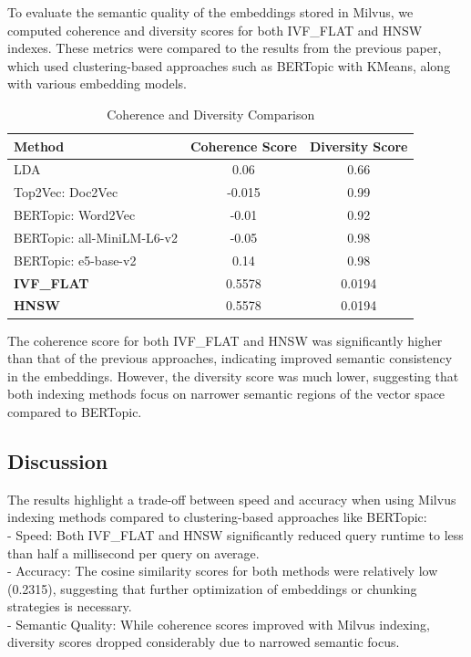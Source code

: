 \documentclass[12pt]{article}
\begin{document}
    To evaluate the semantic quality of the embeddings stored in Milvus, we computed coherence and diversity scores for both IVF\_FLAT and HNSW indexes. These metrics were compared to the results from the previous paper, which used clustering-based approaches such as BERTopic with KMeans, along with various embedding models.

    \begin{table}[h!]
        \centering
        \caption{Coherence and Diversity Comparison}
        \label{tab:coherence-diversity}
        \begin{tabular}{|l|c|c|}
            \hline
            \textbf{Method} & \textbf{Coherence Score} & \textbf{Diversity Score} \\ 
            \hline
            LDA  & 0.06 & 0.66 \\ 
            Top2Vec: Doc2Vec  & -0.015 & 0.99 \\ 
            BERTopic: Word2Vec  & -0.01 & 0.92 \\ 
            BERTopic: all-MiniLM-L6-v2  & -0.05 & 0.98 \\ 
            BERTopic: e5-base-v2  & 0.14 & 0.98 \\ 
            \textbf{IVF\_FLAT}  & 0.5578 & 0.0194 \\ 
            \textbf{HNSW}  & 0.5578 & 0.0194 \\ 
            \hline
        \end{tabular}
    \end{table}
    
    The coherence score for both IVF\_FLAT and HNSW was significantly higher than that of the previous approaches, indicating improved semantic consistency in the embeddings. However, the diversity score was much lower, suggesting that both indexing methods focus on narrower semantic regions of the vector space compared to BERTopic.

    \subsection{Discussion}
    The results highlight a trade-off between speed and accuracy when using Milvus indexing methods compared to clustering-based approaches like BERTopic:\\
    - Speed: Both IVF\_FLAT and HNSW significantly reduced query runtime to less than half a millisecond per query on average.\\
    - Accuracy: The cosine similarity scores for both methods were relatively low (0.2315), suggesting that further optimization of embeddings or chunking strategies is necessary.\\
    - Semantic Quality: While coherence scores improved with Milvus indexing, diversity scores dropped considerably due to narrowed semantic focus.
    
\end{document}

